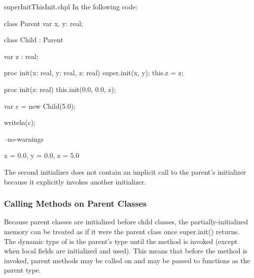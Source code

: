 \begin{chapelexample}{superInitThisInit.chpl}
In the following code:
\begin{chapel}
class Parent {
  var x, y: real;
}

class Child : Parent {
  var z : real;

  proc init(x: real, y: real, z: real) {
    super.init(x, y);
    this.z = z;
  }

  proc init(z: real) {
    this.init(0.0, 0.0, z);
  }
}

var c = new Child(5.0);
\end{chapel}
\begin{chapelpost}
writeln(c);
\end{chapelpost}
\begin{chapelcompopts}
--no-warnings
\end{chapelcompopts}
\begin{chapeloutput}
{x = 0.0, y = 0.0, z = 5.0}
\end{chapeloutput}
The second initializer does not contain an implicit call to the parent's
initializer because it explicitly invokes another initializer.
\end{chapelexample}

\subsubsection{Calling Methods on Parent Classes}
\label{Calling_Methods_on_Parent_Classes}

Because parent classes are initialized before child classes, the
partially-initialized memory can be treated as if it were the parent class
once super.init() returns. The dynamic type of  is the parent's
type until the  method is invoked (except when local fields
are initialized and used). This means that before the  method
is invoked, parent methods may be called on  and  may be
passed to functions as the parent type.

